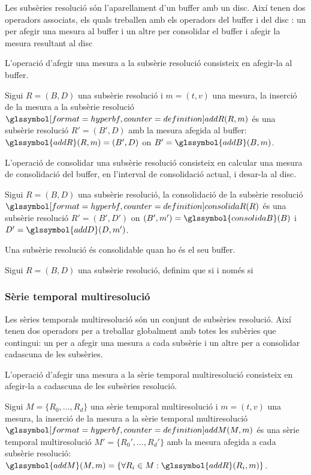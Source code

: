 Les subsèries resolució són l'aparellament d'un buffer amb un disc.
Així tenen dos operadors associats, els quals treballen amb els
operadors del buffer i del disc : un per afegir una mesura al buffer i
un altre per consolidar el buffer i afegir la mesura resultant al disc


L'operació d'afegir una mesura a la subsèrie resolució consisteix en
afegir-la al buffer.
\begin{definition}
  Sigui $R=(B,D)$ una subsèrie resolució i $m=(t,v)$ una mesura, la
  inserció de la mesura a la subsèrie resolució
  $\glssymboldef{addR}(R,m)$ és una subsèrie resolució $R'=(B',D)$
  amb la mesura afegida al buffer: $\glssymbol{addR}(R,m) = (B',D)$ 
  on $B'=\glssymbol{addB}(B,m)$.
\end{definition}


L'operació de consolidar una subsèrie resolució consisteix en calcular
una mesura de consolidació del buffer, en l'interval de consolidació
actual, i desar-la al disc. 
\begin{definition}
  Sigui $R=(B,D)$ una subsèrie resolució, la consolidació de la
  subsèrie resolució $\glssymboldef{consolidaR}(R)$ és una subsèrie
  resolució $R'=(B',D')$ on $(B',m') = \glssymbol{consolidaB}(B)$ i
  $D'=\glssymbol{addD}(D,m')$.
\end{definition}

Una subsèrie resolució és consolidable quan ho és el seu buffer.
\begin{definition}
  Sigui $R=(B,D)$ una subsèrie resolució, definim que
   si i només si 
\end{definition}



\subsubsection{Sèrie temporal multiresolució}

Les sèries temporals multiresolució són un conjunt de subsèries
resolució. Així tenen dos operadors per a treballar globalment amb
totes les subèries que contingui: un per a afegir una mesura a cada
subsèrie i un altre per a consolidar cadascuna de les subsèries.


L'operació d'afegir una mesura a la sèrie temporal multiresolució
consisteix en afegir-la a cadascuna de les subsèries resolució.
\begin{definition}
  Sigui $M=\{R_0,\dotsc,R_d\}$ una sèrie temporal multiresolució i
  $m=(t,v)$ una mesura, la inserció de la mesura a la sèrie temporal
  multiresolució $\glssymboldef{addM}(M,m)$ és una sèrie temporal
  multiresolució $M'=\{R_0',\dotsc,R_d'\}$ amb la mesura afegida a
  cada subsèrie resolució: $\glssymbol{addM}(M,m) = \{ \forall R_i\in
  M: \glssymbol{addR}(R_i,m) \}$.
\end{definition}


